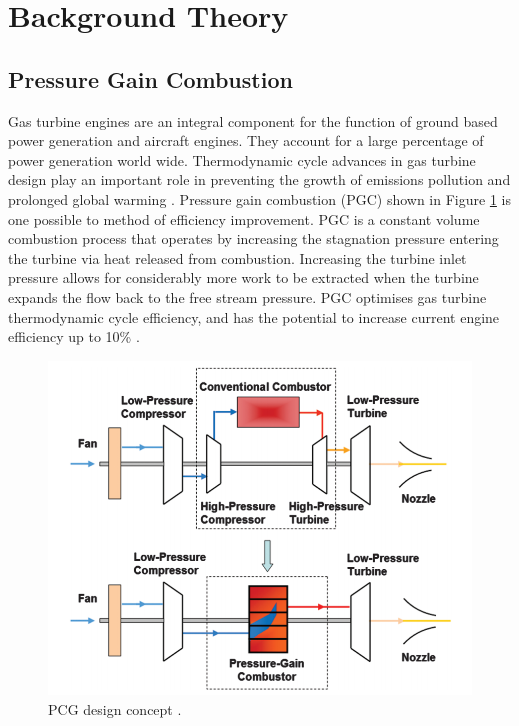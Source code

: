 \newpage

\section{Background Theory} \label{sec:background}
\subsection{Pressure Gain Combustion}
Gas turbine engines are an integral component for the function of ground based power generation and aircraft engines. They account for a large percentage of power generation world wide. Thermodynamic cycle advances in gas turbine design play an important role in preventing the growth of emissions pollution and prolonged global warming \citep{paxson2018pressure}. Pressure gain combustion (PGC) shown in Figure \ref{fig:pcg} is one possible to method of efficiency improvement. PGC is a constant volume combustion process that operates by increasing the stagnation pressure entering the turbine via heat released from combustion. Increasing the turbine inlet pressure allows for considerably more work to be extracted when the turbine expands the flow back to the free stream pressure. PGC optimises gas turbine thermodynamic cycle efficiency, and has the potential to increase current engine efficiency up to 10\% \citep{gulen2013constant}.

\begin{figure}[H] 
 \centering
 \includegraphics[scale=0.5]{pcg.png} 
 \caption{PCG design concept \citep{akbari2009review}.}
 \label{fig:pcg}
\end{figure}

